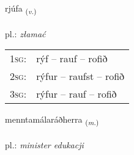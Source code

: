\documentclass[frontgrid, backgrid]{flacards}\usepackage[]{graphicx}\usepackage[]{xcolor}
\begin{document}
\renewcommand{\flhead}{\vskip5pt \fboxsep=0pt {\small\bfseries\footnotesize Sagnorð | czasownik}}
\renewcommand{\fcfoot}{\vskip5pt \fboxsep=0pt \hspace{2pt}{\small\bfseries\footnotesize 3K}}

\renewcommand{\blhead}{\vskip5pt {\small\bfseries\footnotesize Sagnorð | czasownik }}
\renewcommand{\bcfoot}{\vskip5pt \hspace{2pt}{\small\bfseries\footnotesize 3K}}


{rjúfa \small{\textsubscript{(\textit{v.})}} \\[1ex] %
\textphonetic{[rjuːva]} \\
pl.: \emph{złamać} \\  [2ex]
\renewcommand*{\arraystretch}{0.8}
\begin{tabular}{p{1cm}l}
\textsc{1sg}: & rýf -- rauf -- rofið \\ 
\textsc{2sg}: & rýfur -- raufst -- rofið \\ 
\textsc{3sg}: & rýfur -- rauf -- rofið \\ 
\end{tabular}
}

\renewcommand{\flhead}{\vskip5pt \fboxsep=0pt {\small\bfseries\footnotesize Nafnorð | rzeczownik}}
\renewcommand{\fcfoot}{\vskip5pt \fboxsep=0pt \hspace{2pt}{\small\bfseries\footnotesize 3K}}

\renewcommand{\blhead}{\vskip5pt {\small\bfseries\footnotesize Nafnorð | rzeczownik }}
\renewcommand{\bcfoot}{\vskip5pt \hspace{2pt}{\small\bfseries\footnotesize 3K}}


{menntamálaráðherra \small{\textsubscript{(\textit{m.})}} \\[1ex] %
 \\
pl.: \emph{minister edukacji} \\  [2ex]
\renewcommand*{\arraystretch}{0.8}
}
\end{document}
